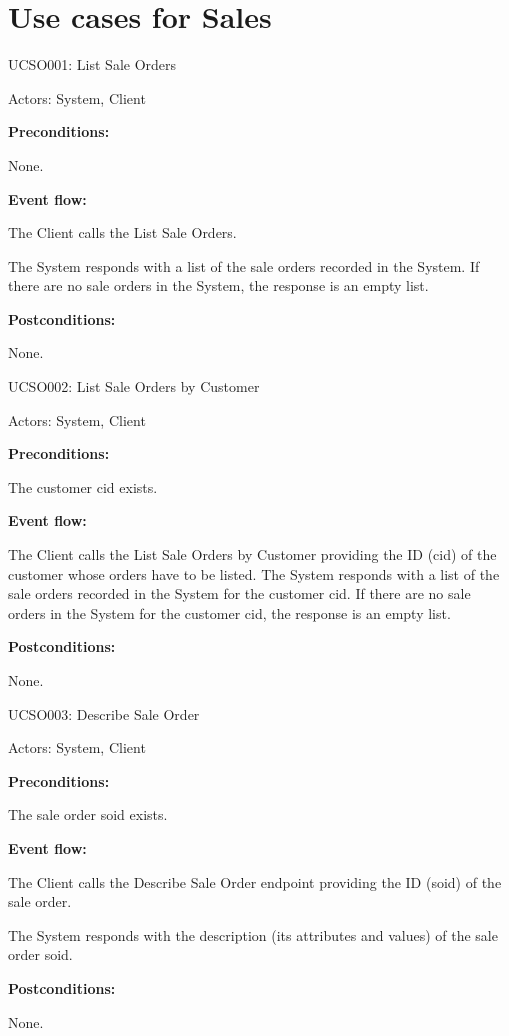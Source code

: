 \section{Use cases for Sales}

\begin{ucbox}{UCSO001: List Sale Orders}
\label{UCSO001}

Actors: System, Client

\textbf{Preconditions:}

\ucitem None.

\textbf{Event flow:}

\ucitem The Client calls the List Sale Orders.

\ucitem The System responds with a list of the sale orders recorded in the System. If there are no sale orders in the System, the response is an empty list.

\textbf{Postconditions:}

\ucitem None.

\end{ucbox}

\begin{ucbox}{UCSO002: List Sale Orders by Customer}
\label{UCSO002}

Actors: System, Client

\textbf{Preconditions:}

\ucitem The customer cid exists.

\textbf{Event flow:}

\ucitem The Client calls the List Sale Orders by Customer providing the ID (cid) of the customer whose orders have to be listed.
\ucitem The System responds with a list of the sale orders recorded in the System for the customer cid. If there are no sale orders in the System for the customer cid, the 
response is an empty list.

\textbf{Postconditions:}

\ucitem None.

\end{ucbox}

\begin{ucbox}{UCSO003: Describe Sale Order}
\label{UCSO003}

Actors: System, Client

\textbf{Preconditions:}

\ucitem The sale order soid exists.

\textbf{Event flow:}

\ucitem The Client calls the Describe Sale Order endpoint providing the ID (soid) of the sale order.

\ucitem The System responds with the description (its attributes and values) of the sale order soid.

\textbf{Postconditions:}

\ucitem None.

\end{ucbox}

